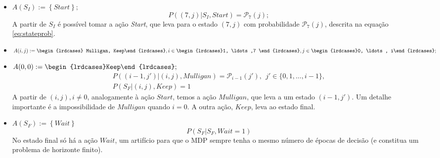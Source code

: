 \begin{itemize}
  \item $A(S_I) := \left\{ Start \right\};$
  \begin{equation*}
    P((7, j) | S_I, Start) =  \mathcal{P}_7(j);
  \end{equation*}
   A partir de $S_I$ é possível tomar a ação \textit{Start}, que leva para o estado $(7, j)$ com
   probabilidade $\mathcal{P}_7(j)$, descrita na equação \ref{eq:stateprob}.
  \item $A(i, j):= \begin{lrdcases} Mulligan, Keep\end{lrdcases}, i\in\begin{lrdcases}1, \ldots ,7 \end{lrdcases}, j \in \begin{lrdcases}0, \ldots, i\end{lrdcases};$
  \item $A(0, 0):=\begin{lrdcases}Keep\end{lrdcases};$
  \begin{gather*}
    P((i - 1, j')| (i, j), Mulligan) = \mathcal{P}_{i-1}(j'),\ \ j' \in \{0,1, \ldots, i-1\},\\
    P(S_F|(i, j), Keep) = 1
  \end{gather*}
   A partir de $(i, j), i \neq 0$, analogamente à ação $Start$, temos a ação $Mulligan$, que leva a um estado
   $(i -1, j')$. Um detalhe importante é a impossibilidade de $Mulligan$ quando $i = 0$. A outra ação,
   $Keep$, leva ao estado final.
   \item $A(S_F) := \left\{ Wait \right\}$
   \begin{equation*}
     P(S_F | S_F, Wait = 1)
   \end{equation*}
   No estado final só há a ação $Wait$, um artifício para que o MDP sempre tenha o mesmo número de
   épocas de decisão (e constitua um problema de horizonte finito).
\end{itemize}

